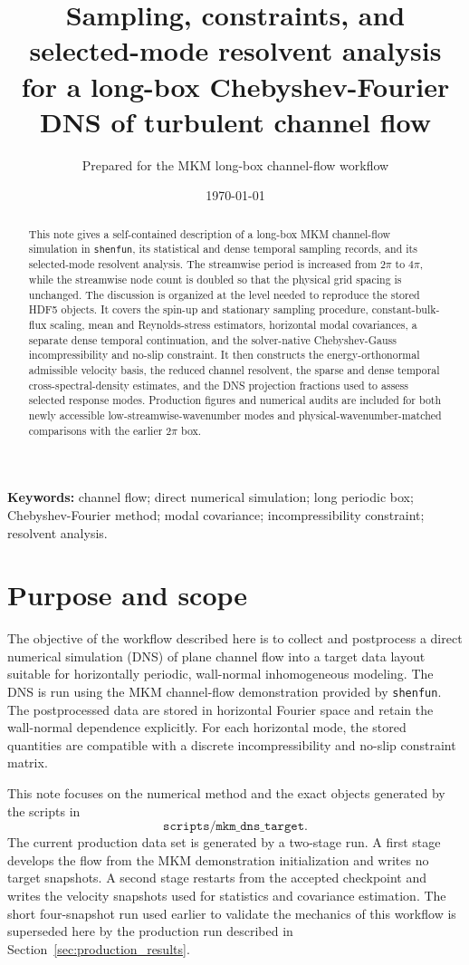 \documentclass[11pt]{article}
\title{Sampling, constraints, and selected-mode resolvent analysis for a long-box Chebyshev-Fourier DNS of turbulent channel flow}
\author{Prepared for the MKM long-box channel-flow workflow}
\date{\today}
\begin{document}
\maketitle

\begin{abstract}
This note gives a self-contained description of a long-box MKM channel-flow
simulation in \texttt{shenfun}, its statistical and dense temporal sampling
records, and its selected-mode resolvent analysis. The streamwise period is
increased from \(2\pi\) to \(4\pi\), while the streamwise node count is
doubled so that the physical grid spacing is unchanged. The discussion is
organized at the level needed to reproduce the stored HDF5 objects. It covers
the spin-up and stationary sampling procedure, constant-bulk-flux scaling,
mean and Reynolds-stress estimators, horizontal modal covariances, a separate
dense temporal continuation, and the solver-native Chebyshev-Gauss
incompressibility and no-slip constraint. It then constructs the
energy-orthonormal admissible velocity basis, the reduced channel resolvent,
the sparse and dense temporal cross-spectral-density estimates, and the DNS
projection fractions used to assess selected response modes. Production
figures and numerical audits are included for both newly accessible
low-streamwise-wavenumber modes and physical-wavenumber-matched comparisons
with the earlier \(2\pi\) box.
\end{abstract}

\noindent\textbf{Keywords:}
channel flow; direct numerical simulation; long periodic box;
Chebyshev-Fourier method; modal covariance; incompressibility constraint;
resolvent analysis.

\section{Purpose and scope}

The objective of the workflow described here is to collect and postprocess a
direct numerical simulation (DNS) of plane channel flow into a target data
layout suitable for horizontally periodic, wall-normal inhomogeneous modeling.
The DNS is run using the MKM channel-flow demonstration provided by
\texttt{shenfun}. The postprocessed data are stored in horizontal Fourier space
and retain the wall-normal dependence explicitly. For each horizontal mode, the
stored quantities are compatible with a discrete incompressibility and no-slip
constraint matrix.

This note focuses on the numerical method and the exact objects generated by
the scripts in
\[
  \texttt{scripts/mkm\_dns\_target}.
\]
The current production data set is generated by a two-stage run. A first stage
develops the flow from the MKM demonstration initialization and writes no
target snapshots. A second stage restarts from the accepted checkpoint and
writes the velocity snapshots used for statistics and covariance estimation.
The short four-snapshot run used earlier to validate the mechanics of this
workflow is superseded here by the production run described in
Section~\ref{sec:production_results}.
\end{document}
